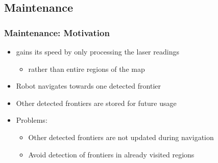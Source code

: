 \subsection*{Maintenance}
\begin{frame}
\frametitle{Maintenance: Motivation}
\begin{itemize}
  \item \FFD gains its speed by only processing the laser readings
  	\begin{itemize}
	  \item rather than entire regions of the map
	\end{itemize}
  \item Robot navigates towards one detected frontier
  \item Other detected frontiers are stored for future usage
  \item Problems:
  \begin{itemize}
    \item Other detected frontiers are not updated during navigation
    \item Avoid detection of frontiers in already visited regions 
  \end{itemize}
\end{itemize} 

% 
\end{frame}


